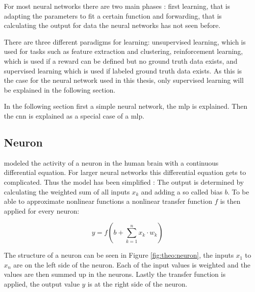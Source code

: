 For most neural networks there are two main phases \cite{bishop1995}: first learning, that is adapting the parameters to fit a certain function and forwarding, that is calculating the output for data the neural networks has not seen before.

There are three different paradigms for learning: unsupervised learning, which is used for tasks such as feature extraction and clustering, reinforcement learning, which is used if a reward can be defined but no ground truth data exists, and supervised learning which is used if labeled ground truth data exists. As this is the case for the neural network used in this thesis, only supervised learning will be explained in the following section.

In the following section first a simple neural network, the \ac{mlp} is explained.
Then the \acf{cnn} is explained as a special case of a \ac{mlp}.

\subsection{Neuron}
\cite{Hodgkin1952} modeled the activity of a neuron in the human brain with a continuous differential equation.
For larger neural networks this differential equation gets to complicated.
Thus the model has been simplified \cite{bishop1995}: The output is determined by calculating the weighted sum of all inputs $x_k$ and adding a so called bias $b$.
To be able to approximate nonlinear functions a nonlinear transfer function $f$ is then applied for every neuron:

\begin{equation}
    y = f\left(b + \sum_{k=1}^n x_k \cdot w_k \right)
\end{equation}

The structure of a neuron can be seen in Figure \ref{fig:theo:neuron}, the inputs $x_1$ to $x_n$ are on the left side of the neuron. Each of the input values is weighted and the values are then summed up in the neurons. Lastly the transfer function is applied, the output value $y$ is at the right side of the neuron.

